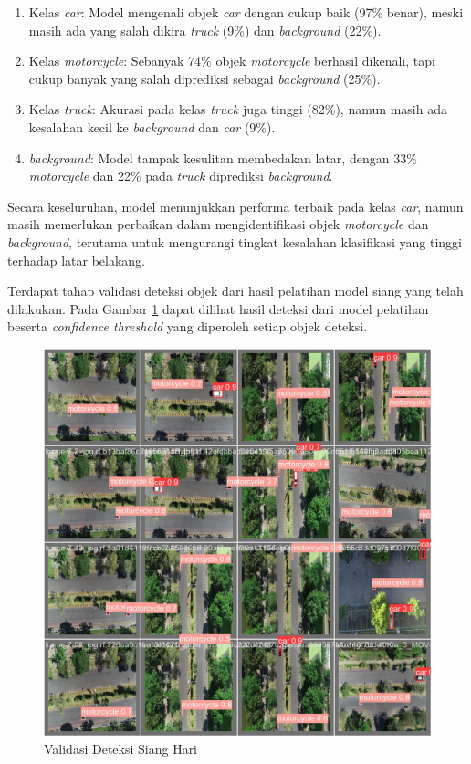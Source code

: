 \begin{enumerate}[nosep]
	\item Kelas \emph{car}:
	Model mengenali objek \emph{car} dengan cukup baik (97\% benar), meski masih ada yang salah dikira \emph{truck} (9\%) dan \emph{background} (22\%).

	\item Kelas \emph{motorcycle}:
	Sebanyak 74\% objek \emph{motorcycle} berhasil dikenali, tapi cukup banyak yang salah diprediksi sebagai \emph{background} (25\%).

	\item Kelas \emph{truck}:
	Akurasi pada kelas \emph{truck} juga tinggi (82\%), namun masih ada kesalahan kecil ke \emph{background} dan \emph{car} (9\%).

	\item \emph{background}:
	Model tampak kesulitan membedakan latar, dengan 33\% \emph{motorcycle} dan 22\% pada \emph{truck} diprediksi \emph{background}.
\end{enumerate}

Secara keseluruhan, model menunjukkan performa terbaik pada kelas \emph{car}, namun masih memerlukan perbaikan dalam mengidentifikasi objek \emph{motorcycle} dan \emph{background}, terutama untuk mengurangi tingkat kesalahan klasifikasi yang tinggi terhadap latar belakang.

Terdapat tahap validasi deteksi objek dari hasil pelatihan model siang yang telah dilakukan. Pada Gambar \ref{fig:validasi deteksi siang} dapat dilihat hasil deteksi dari model pelatihan beserta \emph{confidence threshold} yang diperoleh setiap objek deteksi.

\begin{figure} [H] \centering
  \includegraphics[scale=0.25]{bab4/val_batch_siang.jpg}
  \caption{Validasi Deteksi Siang Hari}
  \label{fig:validasi deteksi siang}
\end{figure}

